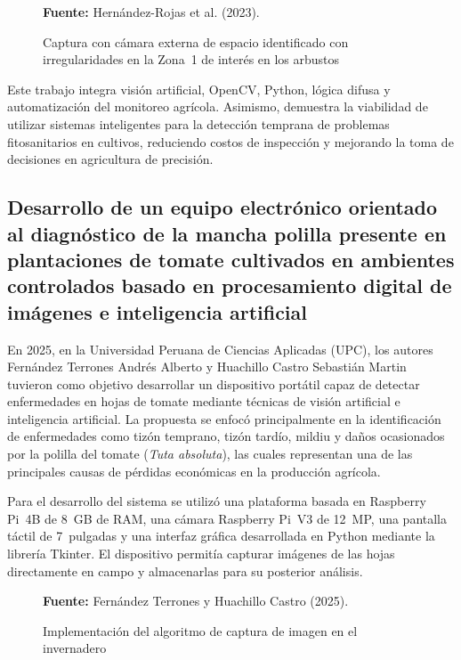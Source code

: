 \begin{figure}[H]
    \centering
    \caption{Captura con cámara externa de espacio identificado con irregularidades en la Zona~1 de interés en los arbustos}
    \label{fig:1_1_6}
    \vspace{0.2cm}
    \footnotesize \textbf{Fuente:} Hernández-Rojas et al. (2023).
\end{figure}

Este trabajo integra visión artificial, OpenCV, Python, lógica difusa y automatización del monitoreo agrícola. Asimismo, demuestra la viabilidad de utilizar sistemas inteligentes para la detección temprana de problemas fitosanitarios en cultivos, reduciendo costos de inspección y mejorando la toma de decisiones en agricultura de precisión.


\subsection{Desarrollo de un equipo electrónico orientado al diagnóstico de la mancha polilla presente en plantaciones de tomate cultivados en ambientes controlados basado en procesamiento digital de imágenes e inteligencia artificial}

En 2025, en la Universidad Peruana de Ciencias Aplicadas (UPC), los autores Fernández Terrones Andrés Alberto y Huachillo Castro Sebastián Martin tuvieron como objetivo desarrollar un dispositivo portátil capaz de detectar enfermedades en hojas de tomate mediante técnicas de visión artificial e inteligencia artificial. La propuesta se enfocó principalmente en la identificación de enfermedades como tizón temprano, tizón tardío, mildiu y daños ocasionados por la polilla del tomate (\textit{Tuta absoluta}), las cuales representan una de las principales causas de pérdidas económicas en la producción agrícola.

Para el desarrollo del sistema se utilizó una plataforma basada en Raspberry Pi~4B de 8~GB de RAM, una cámara Raspberry Pi~V3 de 12~MP, una pantalla táctil de 7~pulgadas y una interfaz gráfica desarrollada en Python mediante la librería Tkinter. El dispositivo permitía capturar imágenes de las hojas directamente en campo y almacenarlas para su posterior análisis.

\begin{figure}[H]
    \centering
    \caption{Implementación del algoritmo de captura de imagen en el invernadero}
    \label{fig:1_1_7}
    \vspace{0.2cm}
    \footnotesize \textbf{Fuente:} Fernández Terrones y Huachillo Castro (2025).
\end{figure}

